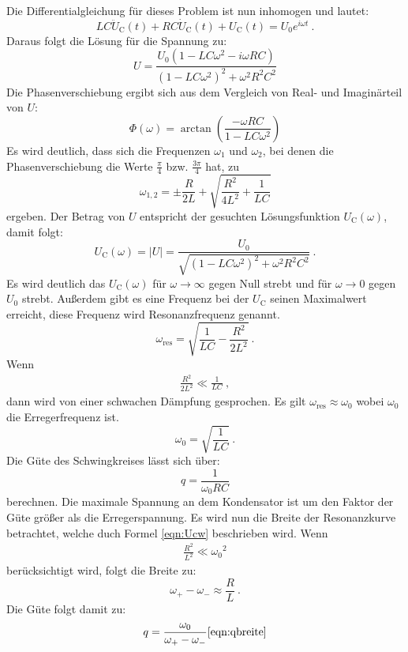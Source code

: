 Die Differentialgleichung für dieses Problem ist nun inhomogen und lautet:
\begin{equation}
	LC \ddot{U}_\text{C}(t) + RC \dot{U}_\text{C}(t) + U_\text{C}(t) = U_0 e^{i \omega t} \ .
\end{equation}
Daraus folgt die Lösung für die Spannung zu:
\begin{equation}
	U = \frac{U_0(1 - LC \omega^2 - i \omega RC)}{(1 - LC \omega^2)^2 + \omega^2 R^2 C^2} 
\end{equation}
Die Phasenverschiebung ergibt sich aus dem Vergleich von Real- und Imaginärteil von $U$:
\begin{equation}
	\Phi (\omega) = \arctan \left(\frac{-\omega RC}{1-LC\omega^2}  \right)
\end{equation}
Es wird deutlich, dass sich die Frequenzen $\omega_1$ und $\omega_2$, bei denen die Phasenverschiebung die Werte $\frac{\pi}{4}$ bzw. $\frac{3\pi}{4}$ hat, zu
\begin{equation}
	\omega_{1,2} = \pm \frac{R}{2L} + \sqrt{\frac{R^2}{4L^2} + \frac{1}{LC}}
	\label{eqn:w12}
\end{equation}
ergeben.
Der Betrag von $U$ entspricht der gesuchten Lösungsfunktion $U_\text{C}(\omega)$, damit folgt:
\begin{equation}
	U_\text{C}(\omega) = |U| = \frac{U_0}{\sqrt{(1 - LC \omega^2)^2 + \omega^2 R^2 C^2}} \ .
	\label{eqn:Ucw}
\end{equation}
Es wird deutlich das $U_\text{C}(\omega)$ für $\omega \to \infty$ gegen Null strebt und für $\omega \to 0$ gegen $U_0$ strebt. Außerdem gibt es eine Frequenz bei der $U_\text{C}$ seinen Maximalwert erreicht, diese Frequenz wird Resonanzfrequenz genannt.
\begin{equation}
	\omega_\text{res} = \sqrt{\frac{1}{LC} - \frac{R^2}{2L^2}} \ .
	\label{eqn:wres}
\end{equation}
Wenn
\begin{align*}
	\frac{R^2}{2L^2} \ll \frac{1}{LC} \ ,
\end{align*}
dann wird von einer schwachen Dämpfung gesprochen. Es gilt $\omega_\text{res} \approx \omega_0$ wobei $\omega_0$ die Erregerfrequenz ist.
\begin{equation}
	\omega_0 = \sqrt{\frac{1}{LC}} \ .
\end{equation}
Die Güte des Schwingkreises lässt sich über:
\begin{equation}
	q = \frac{1}{\omega_0 RC}
	\label{eqn:q}
\end{equation}
berechnen. Die maximale Spannung an dem Kondensator ist um den Faktor der Güte größer als die Erregerspannung. Es wird nun die Breite der Resonanzkurve betrachtet, welche duch Formel \ref{eqn:Ucw} beschrieben wird. Wenn
\begin{align*}
	\frac{R^2}{L^2} \ll {\omega_0}^2
\end{align*}
berücksichtigt wird, folgt die Breite zu:
\begin{equation}
	\omega_+ - \omega_- \approx \frac{R}{L} \ .
	\label{eqn:qbreite}
\end{equation}
Die Güte folgt damit zu:
\begin{equation}
	q = \frac{\omega_0}{\omega_+ - \omega_-}
	\ref{eqn:qbreite}
\end{equation}


